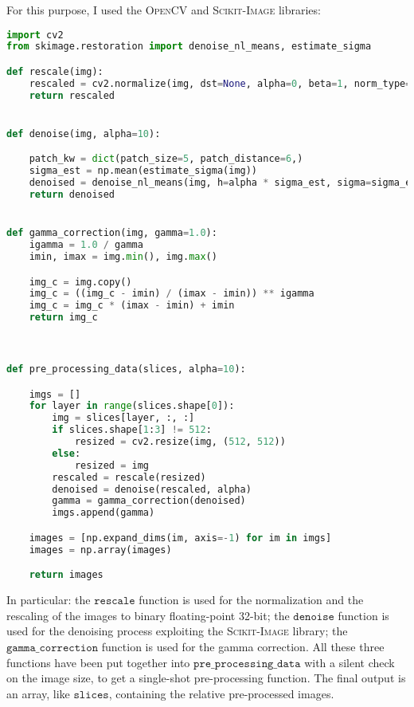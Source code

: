 \documentclass{standalone}
\begin{document}
For this purpose, I used the \textsc{OpenCV} \cite{opencv_library} and \textsc{Scikit-Image} \cite{scikit-image} libraries:

\begin{lstlisting}[language = python, caption=pre-processing function implementation]
import cv2
from skimage.restoration import denoise_nl_means, estimate_sigma

def rescale(img):
    rescaled = cv2.normalize(img, dst=None, alpha=0, beta=1, norm_type=cv2.NORM_MINMAX, dtype=cv2.CV_32F)
    return rescaled


def denoise(img, alpha=10):

    patch_kw = dict(patch_size=5, patch_distance=6,)
    sigma_est = np.mean(estimate_sigma(img))
    denoised = denoise_nl_means(img, h=alpha * sigma_est, sigma=sigma_est, fast_mode=True, **patch_kw)
    return denoised


def gamma_correction(img, gamma=1.0):
    igamma = 1.0 / gamma
    imin, imax = img.min(), img.max()

    img_c = img.copy()
    img_c = ((img_c - imin) / (imax - imin)) ** igamma
    img_c = img_c * (imax - imin) + imin
    return img_c



def pre_processing_data(slices, alpha=10):

    imgs = []
    for layer in range(slices.shape[0]):
        img = slices[layer, :, :]
        if slices.shape[1:3] != 512:
            resized = cv2.resize(img, (512, 512))
        else:
            resized = img
        rescaled = rescale(resized)
        denoised = denoise(rescaled, alpha)
        gamma = gamma_correction(denoised)
        imgs.append(gamma)

    images = [np.expand_dims(im, axis=-1) for im in imgs]
    images = np.array(images)

    return images

\end{lstlisting}

In particular: the $\mathtt{rescale}$ function is used for the normalization and the rescaling of the images to binary floating-point 32-bit; the $\mathtt{denoise}$ function is used for the denoising process exploiting the \textsc{Scikit-Image} library; the $\mathtt{gamma\_correction}$ function is used for the gamma correction.
All these three functions have been put together into $\mathtt{pre\_processing\_data}$ with a silent check on the image size, to get a single-shot pre-processing function.
The final output is an array, like $\mathtt{slices}$, containing the relative pre-processed images.
\end{document}
